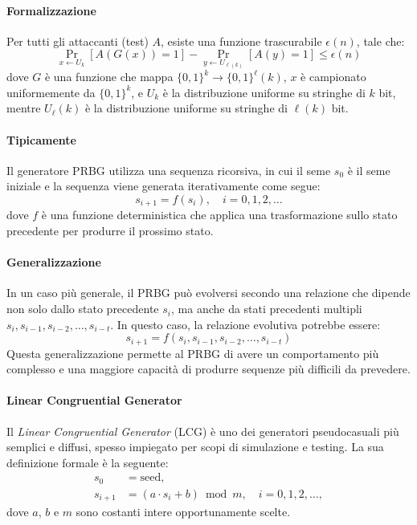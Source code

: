 \documentclass{report}
\begin{document}
\paragraph{Formalizzazione}
Per tutti gli attaccanti (test) \(A\), esiste una funzione trascurabile \( \epsilon(n) \), tale che:
\[
\Pr_{x \gets U_k}[A(G(x)) = 1] - \Pr_{y \gets U_{\ell(k)}}[A(y) = 1] \leq \epsilon(n)
\]
dove \(G\) è una funzione che mappa \(\{0, 1\}^k \rightarrow \{0, 1\}^\ell(k)\), \(x\) è campionato uniformemente da \(\{0, 1\}^k\), e \(U_k\) è la distribuzione uniforme su stringhe di \(k\) bit, mentre \(U_\ell(k)\) è la distribuzione uniforme su stringhe di \(\ell(k)\) bit.

\paragraph{Tipicamente}
Il generatore PRBG utilizza una sequenza ricorsiva, in cui il seme \(s_0\) è il seme iniziale e la sequenza viene generata iterativamente come segue:
\[
s_{i+1} = f(s_i), \quad i = 0, 1, 2, \dots
\]
dove \(f\) è una funzione deterministica che applica una trasformazione sullo stato precedente per produrre il prossimo stato.

\paragraph{Generalizzazione}
In un caso più generale, il PRBG può evolversi secondo una relazione che dipende non solo dallo stato precedente \(s_i\), ma anche da stati precedenti multipli \(s_i, s_{i-1}, s_{i-2}, \dots, s_{i-t}\). In questo caso, la relazione evolutiva potrebbe essere:
\[
s_{i+1} = f(s_i, s_{i-1}, s_{i-2}, \dots, s_{i-t})
\]
Questa generalizzazione permette al PRBG di avere un comportamento più complesso e una maggiore capacità di produrre sequenze più difficili da prevedere.
\paragraph{Linear Congruential Generator}
Il \emph{Linear Congruential Generator} (LCG) è uno dei generatori pseudocasuali più semplici e diffusi, spesso impiegato per scopi di simulazione e testing. La sua definizione formale è la seguente:
\[
\begin{aligned}
s_0 &= \text{seed},\\
s_{i+1} &= (a \cdot s_i + b)\bmod m,\quad i = 0,1,2,\dots,
\end{aligned}
\]
dove \(a\), \(b\) e \(m\) sono costanti intere opportunamente scelte.
\end{document}
